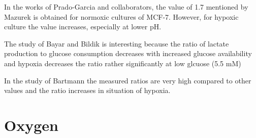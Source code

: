 \documentclass[11pt,a4paper]{article}
\begin{document}
In the works of Prado-Garcia and collaborators, the value of 1.7 mentioned by Mazurek is obtained for normoxic cultures of MCF-7. However, for hypoxic culture the value increases, especially at lower pH.

The study of Bayar and Bildik is interesting because the ratio of lactate production to glucose consumption decreases with increased glucose availability and hypoxia decreases the ratio rather significantly at low glcuose (5.5 mM)

In the study of Bartmann the measured ratios are very high compared to other values and the ratio increases in situation of hypoxia. 


\section{Oxygen}

\newpage


\end{document}
